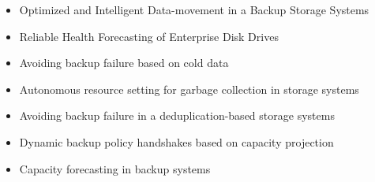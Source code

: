 \documentclass{article}
\begin{document}
\begin{itemize}
\item{Optimized and Intelligent Data-movement in a Backup Storage Systems}

\item{Reliable Health Forecasting of Enterprise Disk Drives}

\item{Avoiding backup failure based on cold data}

\item{Autonomous resource setting for garbage collection in storage systems}

\item{Avoiding backup failure in a deduplication-based storage systems}

\item{Dynamic backup policy handshakes based on capacity projection}

\item{Capacity forecasting in backup systems}
\end{itemize}
\end{document}

